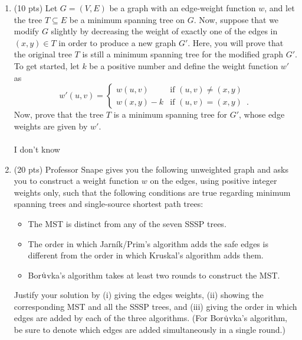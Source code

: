 \documentclass[12pt]{article}
\begin{document}
\begin{enumerate}
\begin{enumerate}
\begin{enumerate}
	\item (5 pts) Prove the asymptotic running time of bidirectional BFS on $T_n$ starting at $(s_n, t_n)$.
	\\ \\ I don't know
	\pagebreak
	
	\end{enumerate}		
	\end{enumerate}
	

	\item \label{2} (10 pts) Let $G=(V,E)$ be a graph with an edge-weight function $w$, and let the tree $T\subseteq E$ be a minimum spanning tree on $G$. Now, suppose that we modify $G$ slightly by decreasing the weight of exactly one of the edges in $(x,y)\in T$ in order to produce a new graph $G'$. Here, you will prove that the original tree $T$ is still a minimum spanning tree for the modified graph $G'$. \\
	 To get started, let $k$ be a positive number and define the weight function $w'$ as
%
\begin{displaymath}
w'(u,v) = \left\{
\begin{array}{ll}
w(u,v) & \textrm{if $(u,v)\not= (x,y)$} \\
w(x,y)-k & \textrm{if $(u,v)=(x,y)$} \enspace .
\end{array}\right.
\end{displaymath}
%
Now, prove that the tree $T$ is a minimum spanning tree for $G'$, whose edge weights are given by $w'$.
	\\ \\ I don't know
	\pagebreak





	\item \label{3} (20 pts) Professor Snape gives you the following unweighted graph and asks you to construct a weight function $w$ on the edges, using positive integer weights only, such that the following conditions are true regarding minimum spanning trees and single-source shortest path trees:
	\begin{itemize}
	\itemsep-0.1pt
	\item The MST is distinct from any of the seven SSSP trees.
	\item The order in which Jarn\'ik/Prim's algorithm adds the safe edges is different from the order in which Kruskal's algorithm adds them.
	\item Bor$\rm{\dot{u}}$vka's algorithm takes at least two rounds to construct the MST.
	\end{itemize}
	Justify your solution by (i) giving the edges weights, (ii) showing the corresponding MST and all the SSSP trees, and (iii) giving the order in which edges are added by each of the three algorithms. (For Bor$\rm{\dot{u}}$vka's algorithm, be sure to denote which edges are added simultaneously in a single round.)


\end{enumerate}
\end{document}
